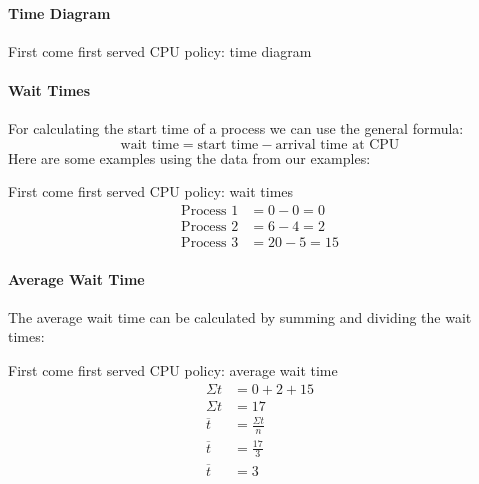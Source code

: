 \paragraph{Time Diagram}\label{par:time_diagram}

\begin{highlight}{First come first served CPU policy: time diagram}
\end{highlight}

\paragraph{Wait Times}\label{par:wait_times}

For calculating the start time of a process we can use the general formula:
\[
    \text{wait time} = \text{start time} - \text{arrival time at CPU}
\]
Here are some examples using the data from our examples:
\begin{highlight}{First come first served CPU policy: wait times}
    \begin{align*}
        \text{Process \(1\)} & = 0 - 0 = 0   \\
        \text{Process \(2\)} & = 6 - 4 = 2   \\
        \text{Process \(3\)} & = 20 - 5 = 15
    \end{align*}
\end{highlight}

\paragraph{Average Wait Time}\label{par:average_wait_time}

The average wait time can be calculated by summing and dividing the wait times:
\begin{highlight}{First come first served CPU policy: average wait time}
    \begin{align*}
        \Sigma t     & = 0 + 2 + 15         \\
        \Sigma t     & = 17                 \\
        \overline{t} & = \frac{\Sigma t}{n} \\
        \overline{t} & = \frac{17}{3}       \\
        \overline{t} & = 3
    \end{align*}
\end{highlight}

